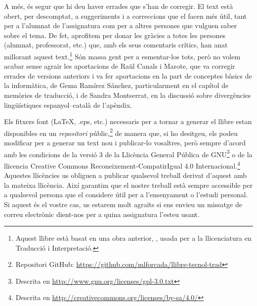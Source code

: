 A més, és segur que hi deu haver errades que s'han de corregir. El
text està obert, per descomptat, a suggeriments i a correccions que el
facen més útil, tant per a l'alumnat de l'assignatura com per a altres
persones que vulguen saber sobre el tema.  De fet, aprofitem per donar
les gràcies a totes les persones (alumnat, professorat, etc.)  que,
amb els seus comentaris crítics, han anat millorant aquest
text.\footnote{Aquest llibre està basat en una obra anterior,
  \protect\citep{forcada09b}, usada per a la llicenciatura en
  Traducció i Interpretació.}  Són massa gent per a esmentar-los tots,
però no volem acabar sense agrair les aportacions de Raül Canals i
Marote, que va corregir errades de versions anteriors i va fer
aportacions en la part de conceptes bàsics de la informàtica, de Gema
Ramírez Sánchez, particularment en el capítol de memòries de
traducció, i de Sandra Montserrat, en la discussió sobre divergències
lingüístiques espanyol--català de l'apèndix.


Els fitxers font (\LaTeX, .eps, etc.) necessaris per a tornar
a generar el llibre estan disponibles en un \emph{repositori} públic,\footnote{Repositori GitHub: \url{https://github.com/mlforcada/llibre-tecnol-trad}} de manera que, si ho desitgeu, els podeu
modificar per a generar un text nou i publicar-lo vosaltres, però
sempre d'acord amb les condicions de la versió 3 de la Llicència General Pública de
GNU\footnote{Descrita en
\url{http://www.gnu.org/licenses/gpl-3.0.txt}} o de la llicencia
Creative Commons Reconeixement-CompatirIgual 4.0 Internacional.\footnote{Descrita en
\url{http://creativecommons.org/licenses/by-sa/4.0/}} Aquestes
llicències us obliguen a publicar qualsevol treball
derivat d'aquest amb la mateixa llicència. Així garantim que el nostre
treball està sempre accessible per a qualsevol persona que el
considere útil per a l'ensenyament o l'estudi personal. Si aquest és el vostre cas,
us estarem molt agraïts si ens envieu un missatge de correu electrònic dient-nos
per a quina assignatura l'esteu usant.
